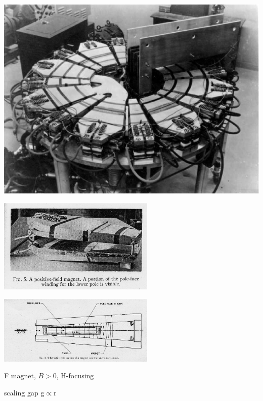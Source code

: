\documentclass[12pt]{article}
\begin{document}
\begin{minipage}{.35\linewidth}
\centering

\includegraphics*[width=1.05\linewidth]{./figs_FFAG_introSlides/mark1.eps}


\smallskip
\includegraphics*[bbllx=90,bblly=130,bburx=760,bbury=440,width=7.5cm]{./figs_FFAG_introSlides/ring1MagPhoto.eps} 

\includegraphics*[bbllx=14,bblly=14,bburx=450,bbury=200,width=7.5cm]{./figs_FFAG_introSlides/ring1MagDraw.eps}

\vspace{-5mm}
\begin{center}  
F magnet, $B>0$, H-focusing

scaling gap g$\propto$r
 \end{center}

\end{minipage}\hspace{1mm}
\end{document}
